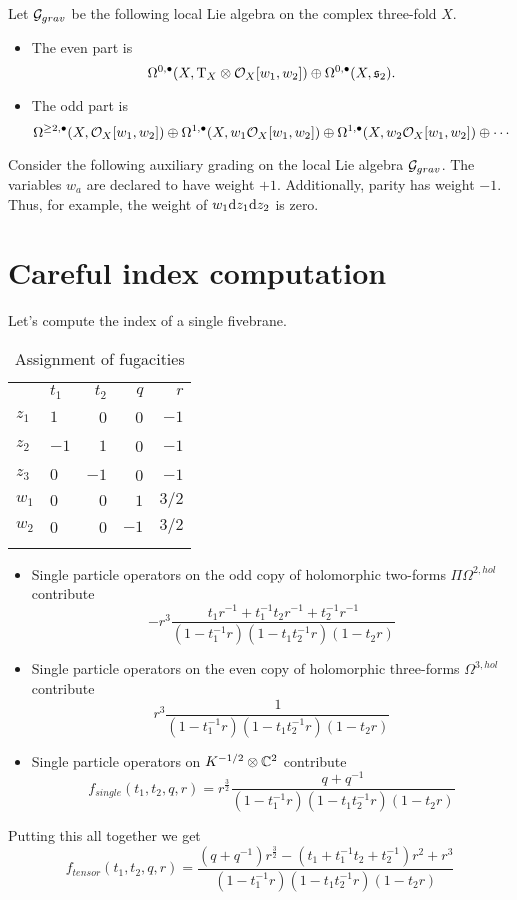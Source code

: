 \documentclass[11pt]{amsart}
\begin{document}
\begin{dfn}
Let $\mathcal G_{grav}$ be the following local Lie algebra on the complex three-fold $X$. 
\begin{itemize}
\item The even part is 
\[
\Omega^{0,\bullet}(X , {\rm T}_X \otimes \mathcal O_X [w_1,w_2]) \oplus \Omega^{0,\bullet}(X , \mathfrak{s}_2) .
\]
\item The odd part is 
\[
\Omega^{\geq 2, \bullet}(X, \mathcal O_X[w_1,w_2]) \oplus \Omega^{1,\bullet}(X, w_1 \mathcal O_X[w_1,w_2]) \oplus \Omega^{1,\bullet}(X, w_2 \mathcal O_X[w_1,w_2]) \oplus \cdots
\]
\end{itemize} 
\end{dfn}

\parsec

Consider the following auxiliary grading on the local Lie algebra $\mathcal G_{grav}$. 
The variables $w_a$ are declared to have weight $+1$. 
Additionally, parity has weight $-1$.
Thus, for example, the weight of $w_1 {\rm d} z_1 {\rm d} z_2$ is zero.

\section{Careful index computation}

Let's compute the index of a single fivebrane. 

\begin{table}[htbp]
\centering
\begin{tabular}{llrrr}
 & $t_1$ & $t_2$ & $q$ & $r$ \\
$z_1$ & $1$ & 0 & 0 & $-1$\\
$z_2$ & $-1$ & $1$ & 0 & $-1$\\
$z_3$ & $0$ & $-1$ & 0 & $-1$\\
$w_1$ & $0$ & $0$ & $1$ & $3/2$\\
$w_2$ & 0& 0 & $-1$ & $3/2$ \\
\\
\end{tabular}
\caption{Assignment of fugacities}
\end{table}

\begin{itemize}
\item Single particle operators on the odd copy of holomorphic two-forms $\Pi \Omega^{2,hol}$ contribute
\[
- r^3 \frac{t_1 r^{-1} + t_1^{-1} t_2 r^{-1} + t_2^{-1} r^{-1} }{(1-t_1^{-1}r) (1-t_1 t_2^{-1} r) (1-t_2 r)} 
\]
\item Single particle operators on the even copy of holomorphic three-forms $\Omega^{3,hol}$ contribute
\[
r^3 \frac{1}{(1-t_1^{-1}r) (1-t_1 t_2^{-1} r) (1-t_2 r)} 
\]
\item Single particle operators on $K^{-1/2} \otimes \mathbb{C}^2$ contribute
\[
f_{single} (t_1,t_2,q,r) = r^{\frac32} \frac{q + q^{-1}}{(1-t_1^{-1}r) (1-t_1 t_2^{-1} r) (1-t_2 r)}
\]
\end{itemize}

Putting this all together we get 
\[
f_{tensor} (t_1,t_2,q,r) = \frac{(q + q^{-1})r^{\frac32} - (t_1 + t_1^{-1} t_2 + t_2^{-1} )r^2 + r^3}{(1-t_1^{-1}r) (1-t_1 t_2^{-1} r) (1-t_2 r)} 
\]
\end{document}
